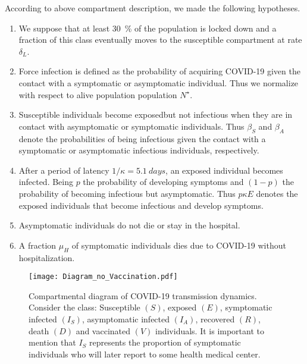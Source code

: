 \begin{assumptions}
    According to above compartment description, we made the following
    hypotheses.
    \begin{enumerate}[label={(A-\arabic*)}]
        \item
            We suppose that at least \SI{30}{\percent} of the population is
            locked down and a fraction of this class eventually moves
            to the susceptible compartment at rate $\delta_L$.
        \item
            Force infection is defined as the probability of acquiring COVID-19
            given the contact with a symptomatic or asymptomatic individual.
            Thus we normalize with respect to alive population population
            $
                N^{\star}
            $.
        \item
            Susceptible individuals become
            exposed\textemdash but not infectious\textemdash
            when they are in contact with asymptomatic or symptomatic
            individuals. Thus $\beta_S$ and $\beta_A$ denote the
            probabilities of being infectious given the contact with a symptomatic or
            asymptomatic infectious individuals, respectively.
        \item
            After a period of latency  $1/\kappa = \SI{5.1}{days}$, an
            exposed individual becomes infected. Being $p$ the probability of
            developing symptoms and $(1-p)$ the probability of becoming infectious
            but asymptomatic. Thus $p\kappa E$ denotes the
            exposed individuals that become infectious and develop symptoms.
        \item
            Asymptomatic individuals do not die or stay in the hospital.
        \item
            A fraction $\mu_{H}$ of symptomatic individuals
            dies due to COVID-19 without hospitalization.
    \end{enumerate}
\end{assumptions}

\begin{figure*}[tbh]
    \centering
      \texttt{[image: Diagram\_no\_Vaccination.pdf]}
    \caption{Compartmental diagram of COVID-19 transmission dynamics. Consider the class: Susceptible $(S)$, exposed $(E)$, symptomatic infected $(I_S)$, asymptomatic 
        infected $(I_A)$, recovered $(R)$, death $(D)$ and vaccinated $(V)$ 
        individuals. It is important to mention that $I_{S}$ represents the 
        proportion of symptomatic individuals who will later report 
        to some health medical center.}
    \label{fig:diagramnolockdownandVacc}
\end{figure*}

